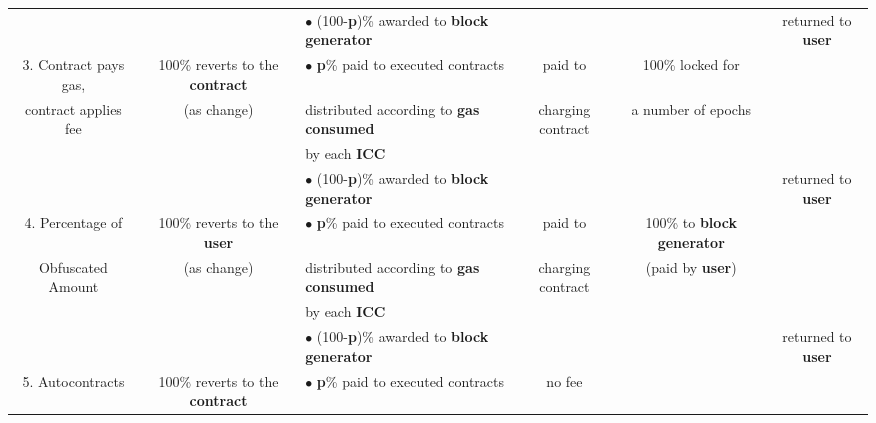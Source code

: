 \documentclass[twocolumn, nofootinbib]{revtex4-2} %
\newcommand{\emphasize}[1]{\textbf{#1}\xspace}
\newcommand{\blockgenerator}{\emphasize{block generator}}
\newcommand{\contract}{\emphasize{contract}}
\newcommand{\gasconsumed}{\emphasize{gas consumed}}
\newcommand{\icc}{\emphasize{ICC}}
\newcommand{\user}{\emphasize{user}}
\newcommand{\emphp}{\emphasize{p}}
\begin{document}
\begin{table*}[t]
\begin{spacing}{1.1}
{\begin{tabular}{| c | c | l | c | c | c |}
					&
					&
					&
					\\ \hline
					&
                    & $\bullet$ (100-\emphp)\% awarded to \blockgenerator
					&
					&
					& \multirow{4}{*}{returned to \user}
					\\
					3. Contract pays gas,
					& 100\% reverts to the \contract
                    & $\bullet$ \emphp\% paid to executed contracts
					& paid to
					& 100\% locked for
					&
					\\
					contract applies fee
					& (as change)
                    & \hspace{0.2cm} distributed according to \gasconsumed
					& charging contract
					& a number of epochs
					&
					\\
					&
                    & \hspace{0.2cm} by each \icc
					&
					&
					&
					\\ \hline
                    &
                    & $\bullet$ (100-\emphp)\% awarded to \blockgenerator
                    &
                    &
                    & \multirow{4}{*}{returned to \user}
                    \\
                    4. Percentage of
                    & 100\% reverts to the \user
                    & $\bullet$ \emphp\% paid to executed contracts
                    & paid to
                    & 100\% to \blockgenerator
                    &
                    \\
                    Obfuscated Amount
                    & (as change)
                    & \hspace{0.2cm} distributed according to \gasconsumed
                    & charging contract
                    & (paid by \user)
                    &
                    \\
                    &
                    & \hspace{0.2cm} by each \icc
                    &
                    &
                    &
                    \\ \hline
                    &
                    & $\bullet$ (100-\emphp)\% awarded to \blockgenerator
                    &
                    &
                    & \multirow{4}{*}{returned to \user}
                    \\
                    5. Autocontracts
                    & 100\% reverts to the \contract
                    & $\bullet$ \emphp\% paid to executed contracts
                    & no fee

\end{tabular}}
\end{spacing}
\end{table*}
\end{document}
